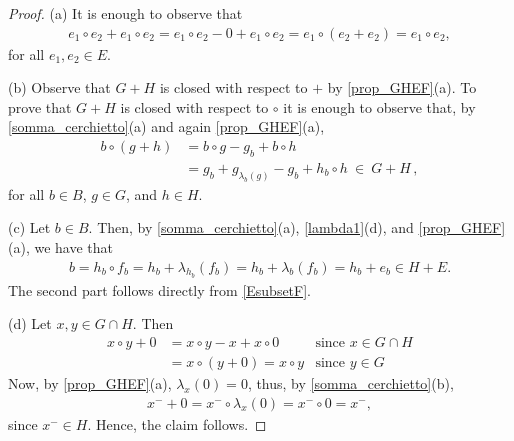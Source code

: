 \documentclass[10pt,a4paper]{amsart}
\begin{document}
\begin{proof} (a) It is enough to observe that
        \begin{align*}
        e_1\circ e_2 +  e_1\circ e_2
        = e_1\circ e_2 - 0 +  e_1\circ e_2
            = e_1\circ(e_2 + e_2)
            =  e_1\circ e_2,
        \end{align*}
        for all $e_1,e_2\in E$.
        
        (b) Observe that $G+H$ is closed with respect to $+$ by \cref{prop_GHEF}(a). To prove that $G+H$ is closed with respect to $\circ$ it is enough to observe that, by \cref{somma_cerchietto}(a) and again \cref{prop_GHEF}(a),
        \begin{align*}
            b\circ(g+h)
            &= b\circ g - g_{b} 
            + b\circ h\\
            &= %
            g_b+g^{}_{\lambda_{b}(g)}-g_{b} + h_b\circ h
            \ \in \ G + H\,,
        \end{align*}
        for all $b\in B$, $g\in G$, and $h\in H$.
        
(c) Let $b\in B$. Then, by \cref{somma_cerchietto}(a), \cref{lambda1}(d), and \cref{prop_GHEF}(a), we have that
        \begin{align*}
            b=h_b \circ f_b=h_b+\lambda_{h_b}(f_b)=h_b+\lambda_b(f_b)=h_b+e_b \in H + E.
        \end{align*}
        The second part follows directly from \cref{EsubsetF}.
        
 (d)    Let $x,y\in G\cap H$. Then
\begin{align*}
    x\circ y + 0 
    &= x\circ y - x + x\circ 0 &\mbox{since $x\in G\cap H$}\\
    &= x\circ(y+0)
    = x\circ y&\mbox{since $y\in G$}
\end{align*}
Now, by \cref{prop_GHEF}(a), $\lambda_x(0)=0$, thus,  
by \cref{somma_cerchietto}(b),
\begin{align*}
    x^- + 0 = x^-\circ\lambda_x(0) = x^-\circ 0 = x^-,
\end{align*}
since $x^- \in H$. 
Hence, the claim follows.
\end{proof}
\end{document}
